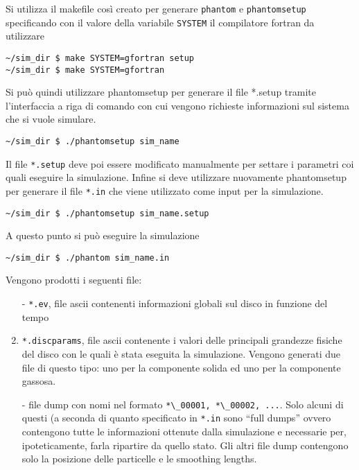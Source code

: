\documentclass[DIN, pagenumber=false, fontsize=11pt, parskip=half]{scrartcl}
\begin{document}
Si utilizza il makefile così creato per generare \lstinline{phantom} e \lstinline{phantomsetup} specificando con il valore della variabile \lstinline{SYSTEM} il compilatore fortran da utilizzare

\begin{lstlisting}
~/sim_dir $ make SYSTEM=gfortran setup
~/sim_dir $ make SYSTEM=gfortran 
\end{lstlisting}

Si può quindi utilizzare phantomsetup per generare il file *.setup tramite l'interfaccia a riga di comando con cui vengono richieste informazioni sul sistema che si vuole simulare.

\begin{lstlisting}
~/sim_dir $ ./phantomsetup sim_name      
\end{lstlisting}

Il file \lstinline{*.setup} deve poi essere modificato manualmente per settare i parametri coi quali eseguire la simulazione. Infine si deve utilizzare nuovamente phantomsetup per generare il file \lstinline{*.in} che viene utilizzato come input per la simulazione.

\begin{lstlisting}
~/sim_dir $ ./phantomsetup sim_name.setup     
\end{lstlisting}

A questo punto si può eseguire la simulazione

\begin{lstlisting}
~/sim_dir $ ./phantom sim_name.in    
\end{lstlisting}

Vengono prodotti i seguenti file:
\begin{enumerate}
 \item[-] \lstinline{*.ev}, file ascii contenenti informazioni globali sul disco in funzione del tempo 
 \item[-] \lstinline{*.discparams}, file ascii contenente i valori delle principali grandezze fisiche del disco con le quali è stata eseguita la simulazione. Vengono generati due file di questo tipo: uno per la componente solida ed uno per la componente gassosa.
 \item[-] file dump con nomi nel formato \lstinline{*\_00001, *\_00002, ...}. Solo alcuni di questi (a seconda di quanto specificato in \lstinline{*.in} sono ``full dumps'' ovvero contengono tutte le informazioni ottenute dalla simulazione e necessarie per, ipoteticamente, farla ripartire da quello stato. Gli altri file dump contengono solo la posizione delle particelle e le smoothing lengths.
\end{enumerate}
\end{document}
